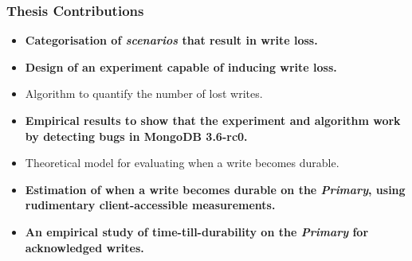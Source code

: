 \documentclass[numfooter,sectionpages,protectFrameTitle, progressbar, cblock, valigncolumns, addlogo]{beamer}
\begin{document}

\begin{frame}

    \frametitle{Thesis Contributions}

    \begin{itemize}
        \item \textbf{Categorisation of \textit{scenarios} that result in write loss.}
        \item \textbf{Design of an experiment capable of inducing write loss.}
        \item Algorithm to quantify the number of lost writes.
        \item \textbf{Empirical results to show that the experiment and algorithm work by detecting bugs in MongoDB 3.6-rc0.}
        \item Theoretical model for evaluating when a write becomes durable.
        \item \textbf{Estimation of when a write becomes durable on the \textit{Primary}, using rudimentary client-accessible measurements.}
        \item \textbf{An empirical study of time-till-durability on the \textit{Primary} for acknowledged writes.}
    \end{itemize}

\end{frame}


\end{document}
